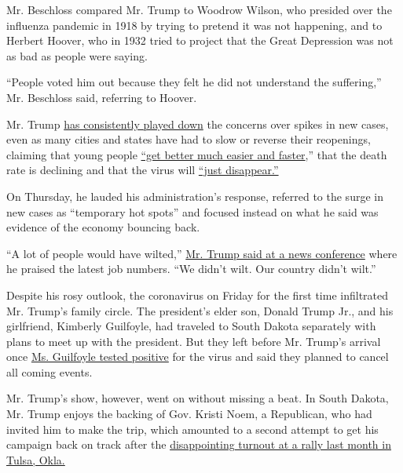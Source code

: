 Mr. Beschloss compared Mr. Trump to Woodrow Wilson, who presided over
the influenza pandemic in 1918 by trying to pretend it was not
happening, and to Herbert Hoover, who in 1932 tried to project that the
Great Depression was not as bad as people were saying.

``People voted him out because they felt he did not understand the
suffering,'' Mr. Beschloss said, referring to Hoover.

Mr. Trump
\href{https://www.nytimes.com/2020/06/26/us/politics/trump-coronavirus.html}{has
consistently played down} the concerns over spikes in new cases, even as
many cities and states have had to slow or reverse their reopenings,
claiming that young people
\href{https://twitter.com/realDonaldTrump/status/1278897430378041344}{``get
better much easier and faster},'' that the death rate is declining and
that the virus will
\href{https://www.nbcnews.com/politics/white-house/trump-says-he-thinks-coronavirus-will-just-disappear-despite-rising-n1232709}{``just
disappear.''}

On Thursday, he lauded his administration's response, referred to the
surge in new cases as ``temporary hot spots'' and focused instead on
what he said was evidence of the economy bouncing back.

``A lot of people would have wilted,''
\href{https://www.whitehouse.gov/briefings-statements/remarks-president-trump-jobs-numbers-report-2/}{Mr.
Trump said at a news conference} where he praised the latest job
numbers. ``We didn't wilt. Our country didn't wilt.''

Despite his rosy outlook, the coronavirus on Friday for the first time
infiltrated Mr. Trump's family circle. The president's elder son, Donald
Trump Jr., and his girlfriend, Kimberly Guilfoyle, had traveled to South
Dakota separately with plans to meet up with the president. But they
left before Mr. Trump's arrival once
\href{https://www.nytimes.com/2020/07/03/us/politics/kimberly-guilfoyle-trump-campaign-coronavirus.html}{Ms.
Guilfoyle tested positive} for the virus and said they planned to cancel
all coming events.

Mr. Trump's show, however, went on without missing a beat. In South
Dakota, Mr. Trump enjoys the backing of Gov. Kristi Noem, a Republican,
who had invited him to make the trip, which amounted to a second attempt
to get his campaign back on track after the
\href{https://www.nytimes.com/2020/06/20/us/politics/tulsa-trump-rally.html}{disappointing
turnout at a rally last month in Tulsa, Okla.}

